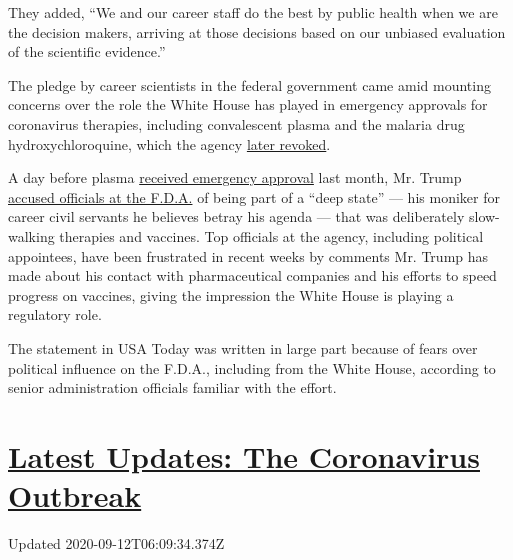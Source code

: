 They added, ``We and our career staff do the best by public health when
we are the decision makers, arriving at those decisions based on our
unbiased evaluation of the scientific evidence.''

The pledge by career scientists in the federal government came amid
mounting concerns over the role the White House has played in emergency
approvals for coronavirus therapies, including convalescent plasma and
the malaria drug hydroxychloroquine, which the agency
\href{https://www.nytimes3xbfgragh.onion/2020/06/15/health/fda-hydroxychloroquine-malaria.html}{later
revoked}.

A day before plasma
\href{https://www.nytimes3xbfgragh.onion/2020/08/23/us/politics/fda-plasma-coronavirus.html}{received
emergency approval} last month, Mr. Trump
\href{https://www.cnn.com/2020/08/22/politics/trump-fda-coronavirus-vaccine/index.html}{accused
officials at the F.D.A.} of being part of a ``deep state'' --- his
moniker for career civil servants he believes betray his agenda --- that
was deliberately slow-walking therapies and vaccines. Top officials at
the agency, including political appointees, have been frustrated in
recent weeks by comments Mr. Trump has made about his contact with
pharmaceutical companies and his efforts to speed progress on vaccines,
giving the impression the White House is playing a regulatory role.

The statement in USA Today was written in large part because of fears
over political influence on the F.D.A., including from the White House,
according to senior administration officials familiar with the effort.

\hypertarget{latest-updates-the-coronavirus-outbreak}{%
\section{\texorpdfstring{\href{https://www.nytimes3xbfgragh.onion/2020/09/11/world/covid-19-coronavirus.html?action=click\&pgtype=Article\&state=default\&region=MAIN_CONTENT_1\&context=storylines_live_updates}{Latest
Updates: The Coronavirus
Outbreak}}{Latest Updates: The Coronavirus Outbreak}}\label{latest-updates-the-coronavirus-outbreak}}

Updated 2020-09-12T06:09:34.374Z

